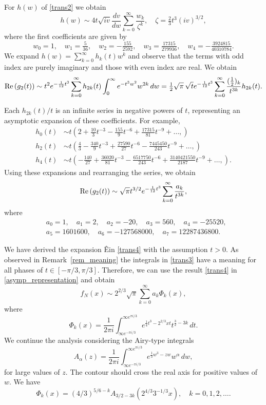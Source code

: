 \documentclass[11pt]{article}
\begin{document}
For $h(w)$ of \eqref{trans2} we obtain
$$
h(w)\sim 4t\sqrt{iv} \frac{dv}{dw}\sum _{{k=0}}^{{\infty}}\frac{w_{k}}{\zeta^{k}},\quad \zeta=\tfrac23t^3(iv)^{3/2},
$$
where the first coefficients are given by
$$
w_0=1,\quad 
w_1=\tfrac{5}{36}, \quad
w_2=-\tfrac{155}{2592}, \quad
w_3=\tfrac{17315}{279936}, \quad
w_4=-\tfrac{3924815}{40310784}. 
$$
We expand $h(w)=\sum_{k=0}^\infty h_k(t)w^k$ and observe that the terms with odd index are purely imaginary and those with even index are real. We obtain
\begin{equation}
\label{trans3}
\mbox{\rm Re}\left(g_2(t)\right)\sim t^2e^{-\frac1{12}t^3}\sum_{k=0}^\infty h_{2k}(t)\int_0^\infty e^{-t^3w^2}w^{2k}\,dw=
\tfrac12\sqrt{\pi}\,\sqrt{t}e^{-\frac1{12}t^3}\sum_{k=0}^\infty \frac{(\frac12)_k}{t^{3k}}h_{2k}(t).
\end{equation}

Each $h_{2k}(t)/t$ is an infinite series in negative powers of $t$, representing an asymptotic expansion of these coefficients. For example,
\begin{align*}
h_0(t)&\sim t\left(2+\tfrac{10}{3}t^{-3}-\tfrac{155}{9}t^{-6}+\tfrac{17315}{81}t^{-9}+\ldots,\right)\\
h_2(t)&\sim t\left( \tfrac43-\tfrac{340}{9}t^{-3}+\tfrac{27590}{27}t^{-6}-\tfrac{7445450}{243}t^{-9}+\ldots,\right)\\
h_4(t)&\sim t\left(-\tfrac{140}{27}+\tfrac{36020}{81}t^{-3}-\tfrac{6517750}{243}t^{-6}+\tfrac{3140421550}{2187}t^{-9}+\ldots,\right).
\end{align*}
Using these expansions and rearranging the series, we obtain
\begin{equation}
\label{trans4}
\mbox{\rm Re}\left(g_2(t)\right)\sim 
\sqrt{\pi}t^{3/2}e^{-\frac1{12}t^3}\sum_{k=0}^\infty \frac{a_k}{t^{3k}},
\end{equation}
where
\begin{align*}
\label{trans4}
&a_0=  1,\quad 
a_1=  2,\quad 
a_2=  -20,\quad 
a_3=  560,\quad
a_4=  -25520,\\
&a_5=  1601600,\quad 
a_6=  -127568000,\quad 
a_7=  12287436800.
\end{align*}

We have derived the expansion Êin \eqref{trans4} with the assumption $t>0$. 
As observed in Remark~\ref{rem_meaning} the integrals in \eqref{trans3} have a meaning for all phases of $t\in[-\pi/3,\pi/3]$. Therefore, we can use the result \eqref{trans4} in \eqref{asymp_representation} and obtain
\begin{equation}
\label{asymp_representation3}
f_N(x)\sim2^{2/3}\sqrt{\pi}\sum_{k=0}^\infty a_k \Phi_k(x),
\end{equation}
where
$$
\Phi_k(x)=\frac1{2\pi i}
\int_{\infty e^{-\pi i/3}}^{\infty e^{\pi i/3}} e^{\frac14t^3-2^{2/3}xt}t^{\frac32-3k}\,dt.
$$
We continue the analysis considering the Airy-type integrals
\begin{equation}
\label{aialpha}
A_{\alpha}(z) =\frac1{2\pi i}
\int_{\infty e^{-\pi i/3}}^{\infty e^{\pi i/3}} e^{\frac13w^3-zw}w^{\alpha}\,dw,
\end{equation}
for large values of $z$. The contour should cross the real axis for positive values of $w$. 
We have
$$
\Phi_k(x)=(4/3)^{5/6-k}A_{3/2-3k}\left(2^{4/3}3^{-1/3}x\right),\quad k=0,1,2,\ldots.
$$
\end{document}
